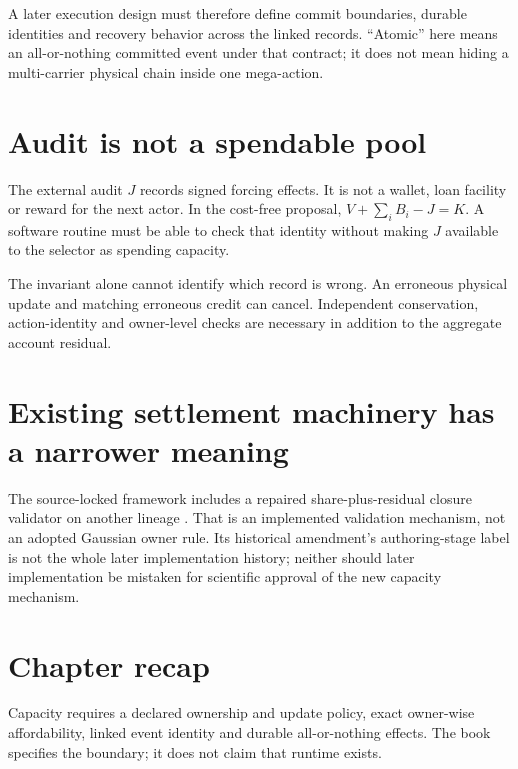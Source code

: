 A later execution design must therefore define commit boundaries, durable
identities and recovery behavior across the linked records. ``Atomic'' here
means an all-or-nothing committed event under that contract; it does not
mean hiding a multi-carrier physical chain inside one mega-action.

\section{Audit is not a spendable pool}
The external audit $J$ records signed forcing effects. It is not a wallet,
loan facility or reward for the next actor. In the cost-free proposal,
$V+\sum_iB_i-J=K$. A software routine must be able to check that
identity without making $J$ available to the selector as spending capacity.

The invariant alone cannot identify which record is wrong. An erroneous
physical update and matching erroneous credit can cancel. Independent
conservation, action-identity and owner-level checks are necessary in
addition to the aggregate account residual.

\section{Existing settlement machinery has a narrower meaning}
The source-locked framework includes a repaired share-plus-residual closure
validator on another lineage \cite{framework}. That is an implemented
validation mechanism, not an adopted Gaussian owner rule. Its historical
amendment's authoring-stage label is not the whole later implementation
history; neither should later implementation be mistaken for scientific
approval of the new capacity mechanism.

\section*{Chapter recap}
Capacity requires a declared ownership and update policy, exact owner-wise
affordability, linked event identity and durable all-or-nothing effects.
The book specifies the boundary; it does not claim that runtime exists.
